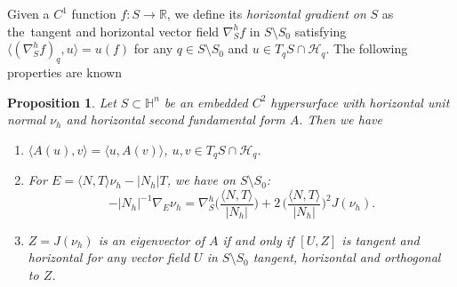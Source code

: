 \documentclass[10pt]{amsart}
\newtheorem{proposition}[theorem]{Proposition}
\theoremstyle{definition}
\theoremstyle{remark}
\numberwithin{equation}{section}
\begin{document}
Given a $C^1$ function $f:S\to{{\mathbb{R}}}$, we define its \emph{horizontal gradient on} $S$ as the~tangent and horizontal vector field $\nabla_S^h f$ in $S\setminus S_0$ satisfying ${\langle{(\nabla_S^hf)_q,u}\rangle}=u(f)$ for any $q\in S\setminus S_0$ and $u\in T_qS\cap{\mathcal{H}}_q$. The following properties are known

\begin{proposition}
\label{prop:sigmaproperties}
Let $S\subset {{\mathbb{H}}}^n$ be an embedded $C^2$ hypersurface with horizontal unit normal ${\nu_{h}}$ and horizontal second fundamental form $A$. Then we have
\begin{enumerate}
\item ${\langle{A(u),v}\rangle}={\langle{u,A(v)}\rangle}$, $u,v\in T_qS\cap{\mathcal{H}}_q$.
\item For $E={\langle{N,T}\rangle}{\nu_{h}}-|N_h|T$, we have on $S\setminus S_0$:
\begin{equation}
\label{eq:nablaEnuh}
-|N_h|^{-1}\nabla_E{\nu_{h}}=\nabla_S^h\bigg(\frac{{\langle{N,T}\rangle}}{|N_h|}\bigg)+2\,\bigg(\frac{{\langle{N,T}\rangle}}{|N_h|}\bigg)^2J({\nu_{h}}).
\end{equation}
\item $Z=J({\nu_{h}})$ is an eigenvector of $A$ if and only if $[U,Z]$ is tangent and horizontal for any vector field $U$ in $S\setminus S_0$ tangent, horizontal and orthogonal to $Z$.
\end{enumerate}
\end{proposition}
\end{document}
